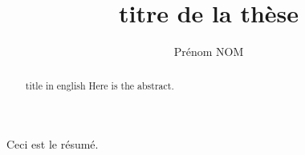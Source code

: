 \documentclass [memoire, letterpaper, oneside, 12pt]{thETS-utf8}
\title{titre de la thèse}
\author{Prénom NOM}
\begin{document}

\maketitle

\presentjury

\begin{avantpropos}

\end{avantpropos}

\begin{remerciements}

\end{remerciements}

\begin{sommaire}
Ceci est le résumé.
\end{sommaire} 


\begin{abstract}{title in english}
Here is the abstract.
\end{abstract}


\tableofcontents

\listoftables

\listoffigures

\lstlistoflistings
\end{document}
